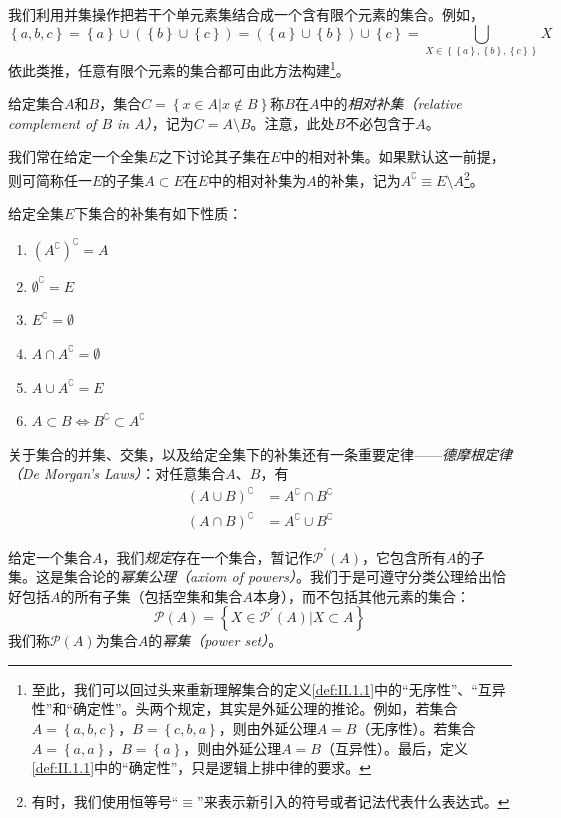 \documentclass[../main.tex]{subfiles}
\begin{document}
我们利用并集操作把若干个单元素集结合成一个含有限个元素的集合。例如，
\[
    \left\{a,b,c\right\}=\left\{a\right\}\cup\left(\left\{b\right\}\cup\left\{c\right\}\right)=\left(\left\{a\right\}\cup\left\{b\right\}\right)\cup\left\{c\right\}=\bigcup_{X\in\left\{\left\{a\right\},\left\{b\right\},\left\{c\right\}\right\}}X
\]
依此类推，任意有限个元素的集合都可由此方法构建\footnote{至此，我们可以回过头来重新理解集合的定义\ref{def:II.1.1}中的“无序性”、“互异性”和“确定性”。头两个规定，其实是外延公理的推论。例如，若集合$A=\left\{a,b,c\right\}$，$B=\left\{c,b,a\right\}$，则由外延公理$A=B$（无序性）。若集合$A=\left\{a,a\right\}$，$B=\left\{a\right\}$，则由外延公理$A=B$（互异性）。最后，定义\ref{def:II.1.1}中的“确定性”，只是逻辑上排中律的要求。}。

给定集合$A$和$B$，集合$C=\left\{x\in A|x\notin B\right\}$称$B$在$A$中的\emph{相对补集（relative complement of $B$ in $A$）}，记为$C=A\setminus B$。注意，此处$B$不必包含于$A$。

我们常在给定一个全集$E$之下讨论其子集在$E$中的相对补集。如果默认这一前提，则可简称任一$E$的子集$A\subset E$在$E$中的相对补集为$A$的补集，记为$A^\complement\equiv E\setminus A$\footnote{有时，我们使用恒等号“$\equiv$”来表示新引入的符号或者记法代表什么表达式。}。

给定全集$E$下集合的补集有如下性质：
\begin{enumerate}
    \item $\left(A^\complement\right)^\complement=A$
    \item $\emptyset^\complement=E$
    \item $E^\complement=\emptyset$
    \item $A\cap A^\complement=\emptyset$
    \item $A\cup A^\complement=E$
    \item $A\subset B\Leftrightarrow B^\complement\subset A^\complement$
\end{enumerate}

关于集合的并集、交集，以及给定全集下的补集还有一条重要定律——\emph{德摩根定律（De Morgan's Laws）}：对任意集合$A$、$B$，有
\begin{align*}
    \left(A\cup B\right)^\complement & =A^\complement\cap B^\complement \\
    \left(A\cap B\right)^\complement & =A^\complement\cup B^\complement
\end{align*}

给定一个集合$A$，我们\emph{规定}存在一个集合，暂记作$\mathcal{P}^\prime\left(A\right)$，它包含所有$A$的子集。这是集合论的\emph{幂集公理（axiom of powers）}。我们于是可遵守分类公理给出恰好包括$A$的所有子集（包括空集和集合$A$本身），而不包括其他元素的集合：
\[
    \mathcal{P}\left(A\right)=\left\{X\in\mathcal{P}^\prime\left(A\right)|X\subset A\right\}
\]
我们称$\mathcal{P}\left(A\right)$为集合$A$的\emph{幂集（power set）}。
\end{document}
